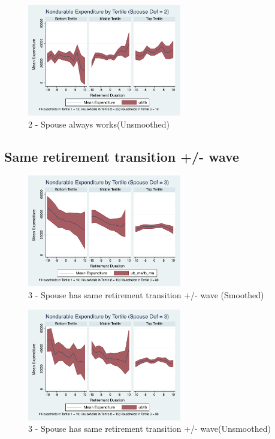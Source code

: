 \documentclass[11pt,onecolumn]{article}
\begin{document}
\begin{figure}[h]
	\caption{2 - Spouse always works(Unsmoothed)}
	\centering
	\includegraphics[width=0.6\textwidth]{../ConsumptionPostRetirement_by_SpouseDef/UNSmoothed/spouse_def_2.pdf}
\end{figure}
\clearpage

\subsection{Same retirement transition +/- wave}
\begin{figure}[h]
	\caption{3 - Spouse has same retirement transition +/- wave (Smoothed)}
	\centering
	\includegraphics[width=0.6\textwidth]{../ConsumptionPostRetirement_by_SpouseDef/Smoothed/spouse_def_3.pdf}
\end{figure}

\begin{figure}[h]
	\caption{3 - Spouse has same retirement transition +/- wave(Unsmoothed)}
	\centering
	\includegraphics[width=0.6\textwidth]{../ConsumptionPostRetirement_by_SpouseDef/UnSmoothed/spouse_def_3.pdf}
\end{figure}
\clearpage
\end{document}
